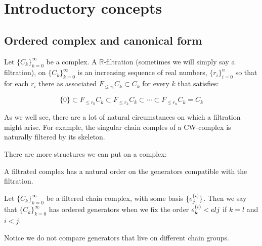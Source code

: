 \chapter{Introductory concepts}





\newcommand{\R}{\mathbb{R}}

\section{Ordered complex and canonical form}


\begin{definition}[$\R$-Filtered complex]
Let $\{C_k\}_{k=0}^{\infty}$ be a complex. 
A $\R$-filtration (sometimes we will simply say a filtration), on $\{C_k\}_{k=0}^{\infty}$ 
is an increasing sequence of real numbers, $\{r_i\}_{i=0}^n$
so that for each $r_i$ there as associated $F_{\leq r_i}C_k\subset C_k$ for every $k$
that satisfies:

$$
\{0\}\subset
F_{\leq r_0}C_k
\subset
F_{\leq r_k}C_k
\subset
\cdots
\subset
F_{\leq r_n}C_k
=
C_k
$$
\end{definition}

As we well see, there are a lot of natural circumstances on which a filtration might arise. For example, 
the singular chain comples of a CW-complex is naturally filtered by its skeleton.

There are more structures we can put on a complex:


\begin{remark}
A filtrated complex has a natural order on the generators compatible with the filtration.
\end{remark}

\begin{definition}

Let $\{C_k\}_{k=0}^{\infty}$ be a filtered chain complex, with some basis $\{e_{j}^{(i)}\}$.
Then we say that $\{C_k\}_{k=0}^{\infty}$ has ordered generators when we fix the order 
$e_{k}^{(i)}<e{l}{j}$ if  $k=l$ and $i<j$.

Notice we do not compare generators that live on different chain groups.
\end{definition}





